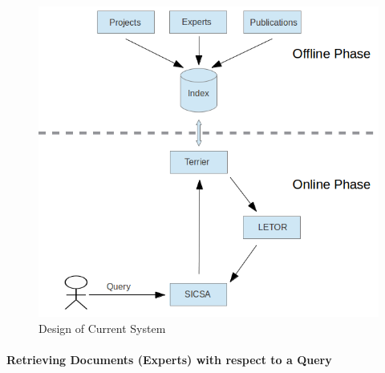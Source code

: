  \begin{figure}
 \centering
 \includegraphics[scale=0.5,keepaspectratio]{./figures/newSystemDesign.png}
 \caption{Design of Current System} \label{fig:newDesign} 
\end{figure}

\paragraph{Retrieving Documents (Experts) with respect to a Query} 


